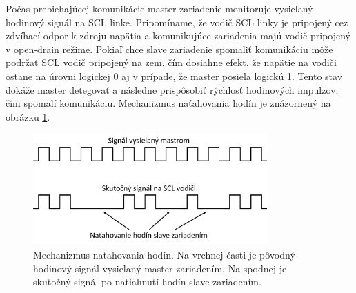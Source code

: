 Počas prebiehajúcej komunikácie master zariadenie monitoruje vysielaný hodinový signál na SCL linke. Pripomíname, že vodič SCL linky je pripojený cez zdvíhací odpor k zdroju napätia a komunikujúce zariadenia majú vodič pripojený v open-drain režime. Pokiaľ chce slave zariadenie spomaliť komunikáciu môže podržať SCL vodič pripojený na zem, čím dosiahne efekt, že napätie na vodiči ostane na úrovni logickej 0 aj v prípade, že master posiela logickú 1. Tento stav dokáže master detegovať a následne prispôsobiť rýchlosť hodinových impulzov, čím spomalí komunikáciu. Mechanizmus naťahovania hodín je znázornený na obrázku \ref{obr:i2cStretch}.

\begin{figure}
    \centerline{\includegraphics[width=0.8\textwidth]{images/i2cStretch.png}}
    \caption[Mechanizmus naťahovania hodín]{Mechanizmus naťahovania hodín. Na vrchnej časti je pôvodný hodinový signál vysielaný master zariadením. Na spodnej je skutočný signál po natiahnutí hodín slave zariadením.}
    \label{obr:i2cStretch}
\end{figure}